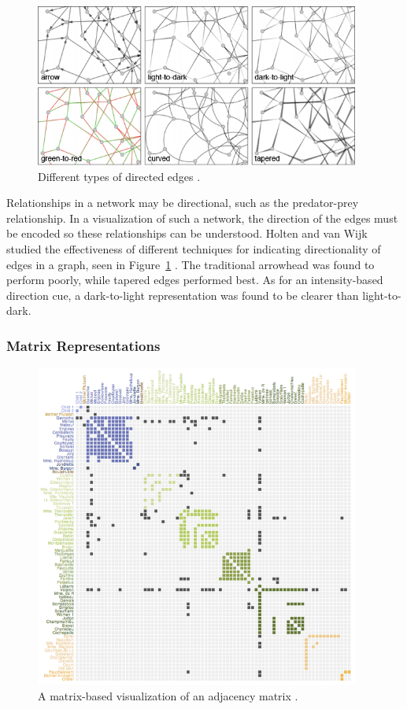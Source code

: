 \begin{figure}[h]
	\centering
	\includegraphics[width=0.95\textwidth]{figures/png/directedEdges.png}
	\caption{Different types of directed edges \cite{holten2009}.}
	\label{fig:directedEdges}
\end{figure}

Relationships in a network may be directional, such as the predator-prey relationship.  In a visualization of such a network, the direction of the edges must be encoded so these relationships can be understood.  Holten and van Wijk studied the effectiveness of different techniques for indicating directionality of edges in a graph, seen in Figure~\ref{fig:directedEdges} \citeyearpar{holten2009}.  The traditional arrowhead was found to perform poorly, while tapered edges performed best.  As for an intensity-based direction cue, a dark-to-light representation was found to be clearer than light-to-dark.

\subsubsection{Matrix Representations}

\begin{figure}[h]
	\centering
	\includegraphics[width=0.95\textwidth]{figures/png/matrix.png}
	\caption{A matrix-based visualization of an adjacency matrix \cite{knuth1993}.}
	\label{fig:matrix}
\end{figure}

